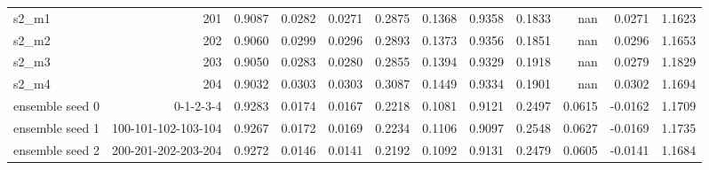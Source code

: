 \begin{table}
\begin{tabular}{lrrrrrrrrrrr}
          s2\_m1 &                 201 &   0.9087 & 0.0282 &       0.0271 & 0.2875 & 0.1368 &    0.9358 &       0.1833 &     nan &       0.0271 &         1.1623 \\
          s2\_m2 &                 202 &   0.9060 & 0.0299 &       0.0296 & 0.2893 & 0.1373 &    0.9356 &       0.1851 &     nan &       0.0296 &         1.1653 \\
          s2\_m3 &                 203 &   0.9050 & 0.0283 &       0.0280 & 0.2855 & 0.1394 &    0.9329 &       0.1918 &     nan &       0.0279 &         1.1829 \\
          s2\_m4 &                 204 &   0.9032 & 0.0303 &       0.0303 & 0.3087 & 0.1449 &    0.9334 &       0.1901 &     nan &       0.0302 &         1.1694 \\
ensemble seed 0 &           0-1-2-3-4 &   0.9283 & 0.0174 &       0.0167 & 0.2218 & 0.1081 &    0.9121 &       0.2497 &  0.0615 &      -0.0162 &         1.1709 \\
ensemble seed 1 & 100-101-102-103-104 &   0.9267 & 0.0172 &       0.0169 & 0.2234 & 0.1106 &    0.9097 &       0.2548 &  0.0627 &      -0.0169 &         1.1735 \\
ensemble seed 2 & 200-201-202-203-204 &   0.9272 & 0.0146 &       0.0141 & 0.2192 & 0.1092 &    0.9131 &       0.2479 &  0.0605 &      -0.0141 &         1.1684 \\
\bottomrule
\end{tabular}
\end{table}
